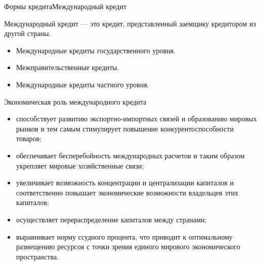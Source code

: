 \documentclass[_DKB_p2_Credit.tex]{subfiles}
\begin{document}
\begin{frame}{Формы кредита}{Международный кредит}
\begin{block}{Международный кредит}
\quad
— это кредит, представленный заемщику кредитором из другой страны.
\end{block}
\begin{itemize}
\item
Международные кредиты государственного уровня.
\item
Межправительственные кредиты.
\item
Международные кредиты частного уровня.
\end{itemize}
\end{frame}
\begin{frame}[allowframebreaks]{Экономическая роль международного кредита }
\begin{itemize}
\item
способствует развитию экспортно-импортных связей и образованию мировых рынков и тем самым стимулирует повышение конкурентоспособности товаров;
\item
обеспечивает бесперебойность международных расчетов и таким образом укрепляет мировые хозяйственные связи;

\pagebreak
\item
увеличивает возможность концентрации и централизации капиталов и соответственно повышает экономические возможности владельцев этих капиталов;
\item
осуществляет перераспределение капиталов между странами;

\pagebreak
\item
выравнивает норму ссудного процента, что приводит к оптимальному размещению ресурсов с точки зрения единого мирового экономического пространства.
\end{itemize}
\end{frame}
\end{document}

